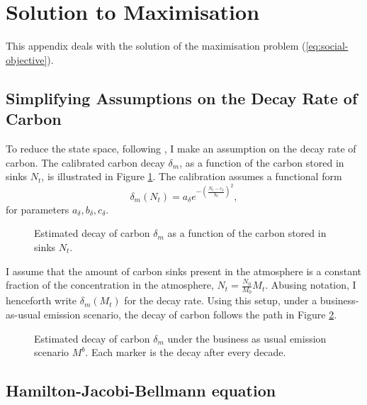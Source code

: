\documentclass[../../main.tex]{subfiles}
\begin{document}
\section{Solution to Maximisation} \label{appendix:solution}

This appendix deals with the solution of the maximisation problem (\ref{eq:social-objective}).

\subsection{Simplifying Assumptions on the Decay Rate of Carbon} \label{appendix:assumptions}
 
To reduce the state space, following \cite{hambel_optimal_2021}, I make an assumption on the decay rate of carbon. The calibrated carbon decay $\delta_m$, as a function of the carbon stored in sinks $N_t$, is illustrated in Figure \ref{fig:decay}. The calibration assumes a functional form \begin{equation}
    \delta_m(N_t) = a_{\delta} e^{-\left(\frac{N_t - c_{\delta}}{b_{\delta}}\right)^2},
\end{equation} for parameters $a_{\delta}, b_{\delta}, c_{\delta}$.

\begin{figure}[H]
    \centering
    
    \caption{Estimated decay of carbon $\delta_m$ as a  function of the carbon stored in sinks $N_t$.}
    \label{fig:decay}
\end{figure}

I assume that the amount of carbon sinks present in the atmosphere is a constant fraction of the concentration in the atmosphere, $N_t = \frac{N_0}{M_0} M_t$. Abusing notation, I henceforth write $\delta_m(M_t)$ for the decay rate. Using this setup, under a business-as-usual emission scenario, the decay of carbon follows the path in Figure \ref{fig:decaypath}.

\begin{figure}[H]
    \centering
    
    \caption{Estimated decay of carbon $\delta_m$ under the business as usual emission scenario $M^{b}$. Each marker is the decay after every decade.}
    \label{fig:decaypath}
\end{figure}

\subsection{Hamilton-Jacobi-Bellmann equation} 
\end{document}
